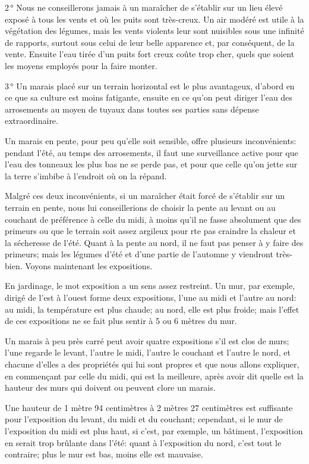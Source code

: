 \documentclass[10pt,a4paper]{book}
\begin{document}
2\,° Nous ne conseillerons jamais à un maraîcher de s'établir sur un lieu élevé exposé à tous les vents et où les puits sont très-creux. Un air modéré est utile à la végétation des légumes, mais les vents violents leur sont nuisibles sous une infinité de rapports, surtout sous celui de leur belle apparence et, par conséquent, de la vente. Ensuite l'eau tirée d'un puits fort creux coûte trop cher, quels que soient les moyens employés pour la faire monter.

3\,° Un marais placé sur un terrain horizontal est le plus avantageux, d'abord en ce que sa culture est moins fatigante, ensuite en ce qu'on peut diriger l'eau des arrosements au moyen de tuyaux dans toutes ses parties sans dépense extraordinaire.

Un marais en pente, pour peu qu'elle soit sensible, offre plusieurs inconvénients: pendant l'été, au temps des arrosements, il faut une surveillance active pour que l'eau des tonneaux les plus bas ne se perde pas, et pour que celle qu'on jette sur la terre s'imbibe à l'endroit où on la répand.

Malgré ces deux inconvénients, si un maraîcher était forcé de s'établir sur un terrain en pente, nous lui conseillerions de choisir la pente au levant ou au couchant de préférence à celle du midi, à moins qu'il ne fasse absolument que des primeurs ou que le terrain soit assez argileux pour rte pas craindre la chaleur et la sécheresse de l'été. Quant à la pente au nord, il ne faut pas penser à y faire des primeurs; mais les légumes d'été et d'une partie de l'automne y viendront très-bien. Voyons maintenant les expositions.

En jardinage, le mot exposition a un sens assez restreint. Un mur, par exemple, dirigé de l'est à l'ouest forme deux expositions, l'une au midi et l'autre au nord: au midi, la température est plus chaude; au nord, elle est plus froide; mais l'effet de ces expositions ne se fait plus sentir à 5 ou 6 mètres du mur.

Un marais à peu près carré peut avoir quatre expositions s'il est clos de murs; l'une regarde le levant, l'autre le midi, l'autre le couchant et l'autre le nord, et chacune d'elles a des propriétés qui lui sont propres et que nous allons expliquer, en commençant par celle du midi, qui est la meilleure, après avoir dit quelle est la hauteur des murs qui doivent ou peuvent clore un marais.

Une hauteur de 1 mètre 94 centimètres à 2 mètres 27 centimètres est suffisante pour l'exposition du levant, du midi et du couchant; cependant, si le mur de l'exposition du midi est plus haut, si c'est, par exemple, un bâtiment, l'exposition en serait trop brûlante dans l'été: quant à l'exposition du nord, c'est tout le contraire; plus le mur est bas, moins elle est mauvaise.
\end{document}
